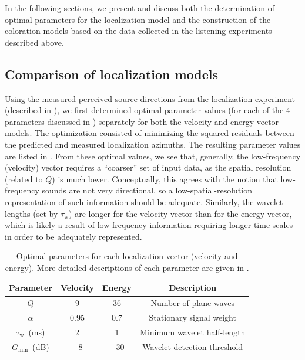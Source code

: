 In the following sections, we present and discuss both the determination of optimal parameters for the localization model and the construction of the coloration models based on the data collected in the listening experiments described above.

\subsection{Comparison of localization models}\label{sec:05_Proposed_Models:Localization_Results}
Using the measured perceived source directions from the localization experiment (described in ), we first determined optimal parameter values (for each of the 4 parameters discussed in ) separately for both the velocity and energy vector models.
The optimization consisted of minimizing the squared-residuals between the predicted and measured localization azimuths.
The resulting parameter values are listed in .
From these optimal values, we see that, generally, the low-frequency (velocity) vector requires a ``coarser'' set of input data, as the spatial resolution (related to $Q$) is much lower.
Conceptually, this agrees with the notion that low-frequency sounds are not very directional, so a low-spatial-resolution representation of such information should be adequate.
Similarly, the wavelet lengths (set by $\tau_\text{w}$) are longer for the velocity vector than for the energy vector, which is likely a result of low-frequency information requiring longer time-scales in order to be adequately represented.

\begin{table}[t]
\centering
 \begin{tabular}{|c|c|c|c|} \hline
 \textbf{Parameter} & \textbf{Velocity} & \textbf{Energy} & \textbf{Description} \\ \hline
 $Q$ & 9 & 36 & Number of plane-waves \\
 $\alpha$ & 0.95 & 0.7 & Stationary signal weight \\
 $\tau_\text{w}$~(ms) & 2 & 1 & Minimum wavelet half-length \\
 $G_\text{min}$~(dB) & $-8$ & $-30$ & Wavelet detection threshold \\ \hline
 \end{tabular}
 \caption[Optimal parameters for the proposed localization model.]{
 Optimal parameters for each localization vector (velocity and energy).
 More detailed descriptions of each parameter are given in .}
 \label{tab:Vector_Parameters}
\end{table}

